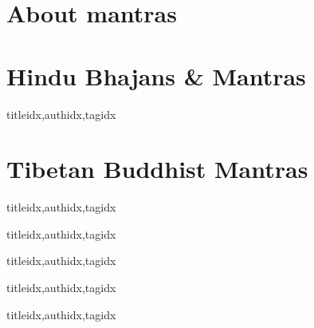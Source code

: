 \documentclass[twoside,10pt]{book}
\begin{document}
     \section{About mantras}
       
     \clearpage\scleardpage
    \section{Hindu Bhajans \& Mantras}
      \begin{songs}{titleidx,authidx,tagidx}
        \setcounter{songnum}{100}
        
      \end{songs}
     \scleardpage
    \section{Tibetan Buddhist Mantras}
      \begin{songs}{titleidx,authidx,tagidx}
        \setcounter{songnum}{150}
        
      \end{songs}

  \clearpage\scleardpage
    \begin{songs}{titleidx,authidx,tagidx}
      \setcounter{songnum}{200}
      
    \end{songs}

  \clearpage\scleardpage
    \begin{songs}{titleidx,authidx,tagidx}
      \setcounter{songnum}{300}
      
    \end{songs}

  \clearpage\scleardpage
    \begin{songs}{titleidx,authidx,tagidx}
      \setcounter{songnum}{400}
      
    \end{songs}

  \clearpage\scleardpage
    \begin{songs}{titleidx,authidx,tagidx}
      \setcounter{songnum}{500}
      
    \end{songs}
    
\end{document}
